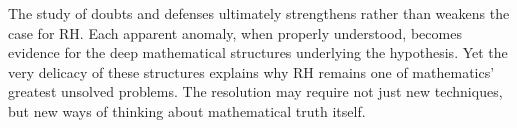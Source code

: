 The study of doubts and defenses ultimately strengthens rather than weakens the case for RH. Each apparent anomaly, when properly understood, becomes evidence for the deep mathematical structures underlying the hypothesis. Yet the very delicacy of these structures explains why RH remains one of mathematics' greatest unsolved problems. The resolution may require not just new techniques, but new ways of thinking about mathematical truth itself.